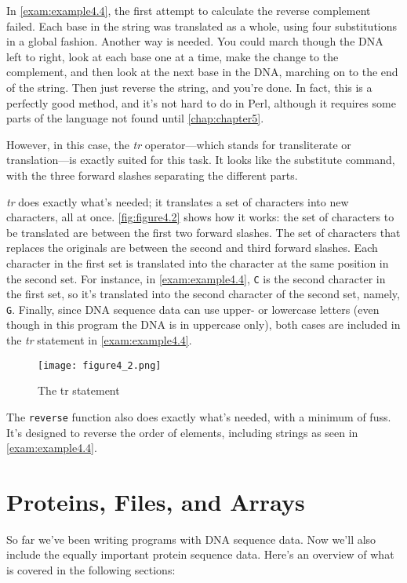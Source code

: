 In \autoref{exam:example4.4}, the first attempt to calculate the reverse complement failed. Each base in the string was translated as a whole, using four substitutions in a global fashion. Another way is needed. You could march though the DNA left to right, look at each base one at a time, make the change to the complement, and then look at the next base in the DNA, marching on to the end of the string. Then just reverse the string, and you're done. In fact, this is a perfectly good method, and it's not hard to do in Perl, although it requires some parts of the language not found until \autoref{chap:chapter5}.

However, in this case, the \textit{tr} operator—which stands for transliterate or translation—is exactly suited for this task. It looks like the substitute command, with the three forward slashes separating the different parts.

\textit{tr} does exactly what's needed; it translates a set of characters into new characters, all at once. \autoref{fig:figure4.2} shows how it works: the set of characters to be translated are between the first two forward slashes. The set of characters that replaces the originals are between the second and third forward slashes. Each character in the first set is translated into the character at the same position in the second set. For instance, in \autoref{exam:example4.4}, \verb|C| is the second character in the first set, so it's translated into the second character of the second set, namely, \verb|G|. Finally, since DNA sequence data can use upper- or lowercase letters (even though in this program the DNA is in uppercase only), both cases are included in the \textit{tr} statement in \autoref{exam:example4.4}.

\begin{figure}
  \centering
  \texttt{[image: figure4\_2.png]}
  \caption{The tr statement}
  \label{fig:figure4.2}
\end{figure}

The \verb|reverse| function also does exactly what's needed, with a minimum of fuss. It's designed to reverse the order of elements, including strings as seen in \autoref{exam:example4.4}.

\section{Proteins, Files, and Arrays}
So far we've been writing programs with DNA sequence data. Now we'll also include the equally important protein sequence data. Here's an overview of what is covered in the following sections:

